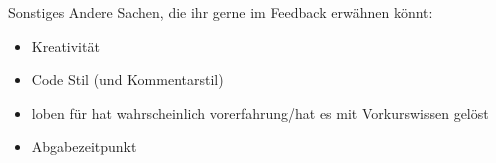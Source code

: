 \documentclass[ngerman,accentcolor=3c,colorbacktitle,12pt,T1,points=true, RGB]{tudaexercise}
\begin{document}
\begin{task}[points=auto]{Sonstiges}
	Andere Sachen, die ihr gerne im Feedback erwähnen könnt:
	\begin{itemize}
		\item Kreativität
		\item Code Stil (und Kommentarstil)
		\item loben für hat wahrscheinlich vorerfahrung/hat es mit Vorkurswissen gelöst
		\item Abgabezeitpunkt
	\end{itemize}
\end{task}
\end{document}
